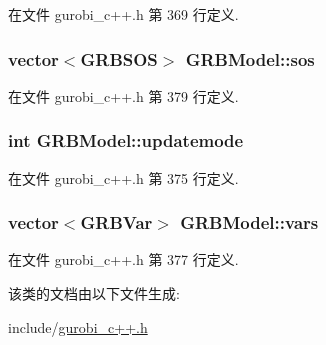 在文件 gurobi\+\_\+c++.\+h 第 369 行定义.

\subsubsection[{\texorpdfstring{sos}{sos}}]{\setlength{\rightskip}{0pt plus 5cm}vector$<${\bf G\+R\+B\+S\+OS}$>$ G\+R\+B\+Model\+::sos\hspace{0.3cm}{\ttfamily [private]}}\hypertarget{classGRBModel_a61a1fbf3b90e08e1c149b2081ea9b847}{}\label{classGRBModel_a61a1fbf3b90e08e1c149b2081ea9b847}


在文件 gurobi\+\_\+c++.\+h 第 379 行定义.

\subsubsection[{\texorpdfstring{updatemode}{updatemode}}]{\setlength{\rightskip}{0pt plus 5cm}int G\+R\+B\+Model\+::updatemode\hspace{0.3cm}{\ttfamily [private]}}\hypertarget{classGRBModel_a717756c5b80328a48913e94986ba65fa}{}\label{classGRBModel_a717756c5b80328a48913e94986ba65fa}


在文件 gurobi\+\_\+c++.\+h 第 375 行定义.

\subsubsection[{\texorpdfstring{vars}{vars}}]{\setlength{\rightskip}{0pt plus 5cm}vector$<${\bf G\+R\+B\+Var}$>$ G\+R\+B\+Model\+::vars\hspace{0.3cm}{\ttfamily [private]}}\hypertarget{classGRBModel_a96d3ba518278642c7b13b74ad9bc7f7e}{}\label{classGRBModel_a96d3ba518278642c7b13b74ad9bc7f7e}


在文件 gurobi\+\_\+c++.\+h 第 377 行定义.



该类的文档由以下文件生成\+:\begin{DoxyCompactItemize}
\item 
include/\hyperlink{gurobi__c_09_09_8h}{gurobi\+\_\+c++.\+h}\end{DoxyCompactItemize}
